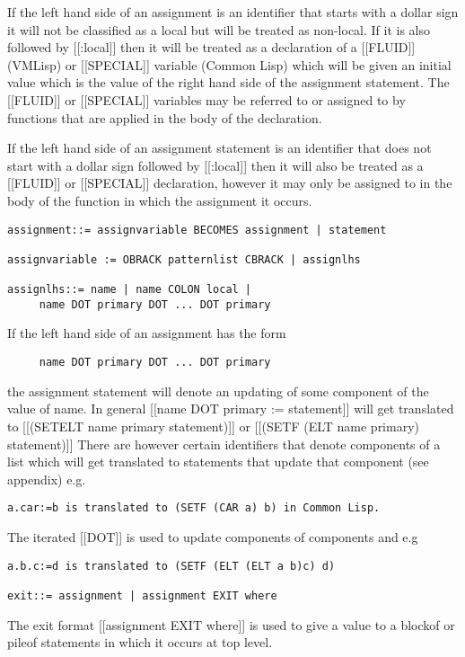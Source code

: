 \documentclass{article}
\begin{document}
If the left hand side of an assignment is an identifier that starts with
a dollar sign it will not be classified as a local but will
be treated as non-local. If it is also followed by [[:local]] then it
will be treated as a declaration of a [[FLUID]] (VMLisp) or [[SPECIAL]]
variable (Common Lisp) which will be given an initial value which is the
value of the right hand side of the assignment statement.
The [[FLUID]] or [[SPECIAL]] variables may be referred to or assigned to
by functions that are applied in the body of the declaration.

If the left hand side of an assignment statement is
an identifier that does not start with a dollar sign followed
by [[:local]] then it will also be treated as a [[FLUID]] or [[SPECIAL]]
declaration, however it may only be assigned to in the body
of the function in which the assignment it occurs.
\begin{verbatim}
assignment::= assignvariable BECOMES assignment | statement

assignvariable := OBRACK patternlist CBRACK | assignlhs

assignlhs::= name | name COLON local |
     name DOT primary DOT ... DOT primary
\end{verbatim}

If the left hand side of an assignment has the form
\begin{verbatim}
     name DOT primary DOT ... DOT primary
\end{verbatim}
the assignment statement will denote an updating of some component
of the value of name.  In general [[name DOT primary := statement]]
will get translated to [[(SETELT name primary statement)]] or
[[(SETF (ELT name primary) statement)]]
There are however certain identifiers that denote components of
a list which will get translated to statements that update that
component (see appendix) e.g.
\begin{verbatim}
a.car:=b is translated to (SETF (CAR a) b) in Common Lisp.
\end{verbatim}
The iterated [[DOT]] is used to update components of components
and e.g

\begin{verbatim}
a.b.c:=d is translated to (SETF (ELT (ELT a b)c) d)

exit::= assignment | assignment EXIT where
\end{verbatim}

The exit format [[assignment EXIT where]] is used to give a value to
a blockof or pileof statements in which it occurs at top level.
\end{document}
